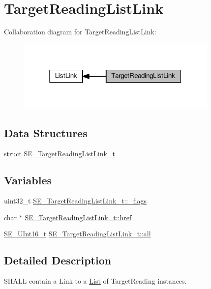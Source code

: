 \hypertarget{group__TargetReadingListLink}{}\section{Target\+Reading\+List\+Link}
\label{group__TargetReadingListLink}
Collaboration diagram for Target\+Reading\+List\+Link\+:\nopagebreak
\begin{figure}[H]
\begin{center}
\leavevmode
\includegraphics[width=280pt]{group__TargetReadingListLink}
\end{center}
\end{figure}
\subsection*{Data Structures}
\begin{DoxyCompactItemize}
\item 
struct \hyperlink{structSE__TargetReadingListLink__t}{S\+E\+\_\+\+Target\+Reading\+List\+Link\+\_\+t}
\end{DoxyCompactItemize}
\subsection*{Variables}
\begin{DoxyCompactItemize}
\item 
uint32\+\_\+t \hyperlink{group__TargetReadingListLink_gaf9ae193291ad0d9b0f964f277bebb433}{S\+E\+\_\+\+Target\+Reading\+List\+Link\+\_\+t\+::\+\_\+flags}
\item 
char $\ast$ \hyperlink{group__TargetReadingListLink_ga0c31f771ab4c6cc09d0a4326e42810b6}{S\+E\+\_\+\+Target\+Reading\+List\+Link\+\_\+t\+::href}
\item 
\hyperlink{group__UInt16_gac68d541f189538bfd30cfaa712d20d29}{S\+E\+\_\+\+U\+Int16\+\_\+t} \hyperlink{group__TargetReadingListLink_ga9a98530d8abad37e41a80192356f52a3}{S\+E\+\_\+\+Target\+Reading\+List\+Link\+\_\+t\+::all}
\end{DoxyCompactItemize}


\subsection{Detailed Description}
S\+H\+A\+LL contain a Link to a \hyperlink{structList}{List} of Target\+Reading instances. 


